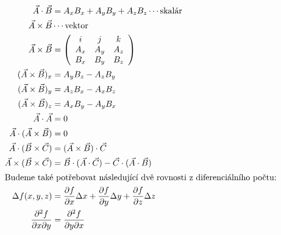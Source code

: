 {    \begin{align}
      \vec{A}\cdot \vec{B}    
        &=      A_x B_x+A_y B_y+A_z B_z \cdots\text{skalár}                           \\
      \vec{A}\times\vec{B}    
        &\cdots \mathrm{vektor}                                                       \\
      \vec{A}\times\vec{B}    
        &=  \left(
              \begin{array}{ccc}
                 i  &  j  &  k   \\
                A_x & A_y & A_z  \\
                B_x & B_y & B_z
              \end{array}
            \right)                                                                   \\
     (\vec{A}\times \vec{B})_x 
       &= A_yB_z-A_zB_y \label{fyz:eq244}                            \\
     (\vec{A}\times \vec{B})_y 
       &= A_zB_x-A_xB_z                                                     \nonumber \\
     (\vec{A}\times \vec{B})_z 
       &= A_xB_y-A_yB_x                                                     \nonumber \\
      \vec{A}\cdot  \vec{A}     
       &= 0                                                                           \\
      \vec{A}\cdot (\vec{A}\times\vec{B})   
       &= 0                                                                           \\
      \vec{A}\cdot (\vec{B}\times\vec{C})  
       &= (\vec{A}\times \vec{B})\cdot\vec{C}                                         \\
      \vec{A}\times(\vec{B}\times\vec{C})  
        &=  \vec{B}\cdot (\vec{A} \cdot\vec{C})
           -\vec{C}\cdot (\vec{A} \cdot\vec{B})
                                                    \label{fey:eq_baccab}             \\
      \shortintertext{Budeme také potřebovat následující dvě rovnosti z dife\-ren\-ci\-ál\-ní\-ho 
                      počtu:}
      \Delta f(x,y,z)                      
        &=  \frac{\partial f}{\partial x}\Delta x +
            \frac{\partial f}{\partial y}\Delta y + 
            \frac{\partial f}{\partial z}\Delta z                     \label{fyz:eq245}        \\
      \frac{\partial^2f}{\partial x\partial y}
        &=\frac{\partial^2f}{\partial y\partial x}  \label{fyz:eq246}
    \end{align} 

}
